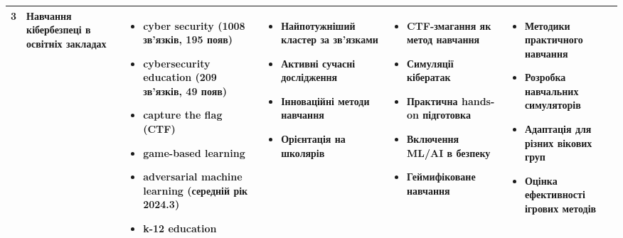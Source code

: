 {\begin{longtable}{|c|p{2.6cm}|p{3cm}|p{3.1cm}|p{3cm}|p{3cm}|}
\cellcolor{blue!20}3 & 
\textbf{Навчання кібербезпеці в освітніх закладах} & 
\begin{itemize}
    \item cyber security (1008 зв'язків, 195 появ)
    \item cybersecurity education (209 зв'язків, 49 появ)
    \item capture the flag (CTF)
    \item game-based learning
    \item adversarial machine learning (середній рік 2024.3)
    \item k-12 education
\end{itemize} & 
\begin{itemize}
    \item Найпотужніший кластер за зв'язками
    \item Активні сучасні дослідження
    \item Інноваційні методи навчання
    \item Орієнтація на школярів
\end{itemize} & 
\begin{itemize}
    \item CTF-змагання як метод навчання
    \item Симуляції кібератак
    \item Практична hands-on підготовка
    \item Включення ML/AI в безпеку
    \item Геймифіковане навчання
\end{itemize} & 
\begin{itemize}
    \item Методики практичного навчання
    \item Розробка навчальних симуляторів
    \item Адаптація для різних вікових груп
    \item Оцінка ефективності ігрових методів
\end{itemize} \\
\hline


\end{longtable}}

